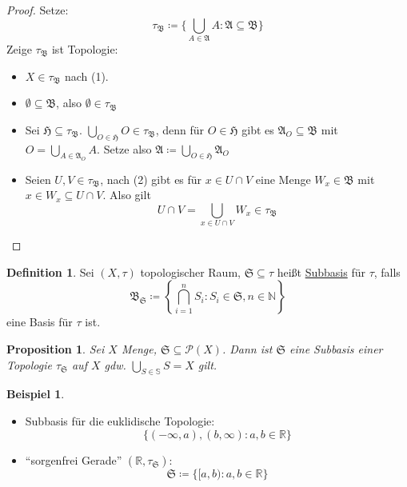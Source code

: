 \documentclass[12pt]{scrartcl}%
\newtheorem{prop}{Proposition}
\theoremstyle{definition}
\newtheorem*{defn}{Definition}
\newtheorem{ex}{Beispiel}
\theoremstyle{remark}
\newcommand{\powerset}{\mathcal{P}}
\begin{document}
\begin{proof}
    Setze: $$\tau_\mathfrak{B} \coloneqq \{ \bigcup_{A\in \mathfrak{A}} A: \mathfrak{A} \subseteq \mathfrak{B} \}$$ Zeige $\tau_\mathfrak{B}$ ist Topologie:

    \begin{itemize}
        \item $X\in \tau_\mathfrak{B}$ nach (1).
        \item $\emptyset \subseteq \mathfrak{B}$, also $\emptyset \in \tau_\mathfrak{B}$
        \item Sei $\mathfrak{H} \subseteq \tau_\mathfrak{B}$. $\bigcup_{O\in \mathfrak{H}} O \in \tau_\mathfrak{B}$, denn für $O\in\mathfrak{H}$ gibt es $\mathfrak{A}_O\subseteq \mathfrak{B}$ mit $O = \bigcup_{A\in \mathfrak{A}_O} A$. Setze also $\mathfrak{A} \coloneqq \bigcup_{O\in \mathfrak{H}} \mathfrak{A}_O$
        \item Seien $U,V\in \tau_\mathfrak{B}$, nach (2) gibt es für $x\in U\cap V$ eine Menge $W_x\in \mathfrak{B}$ mit $x\in W_x \subseteq U \cap V$. Also gilt $$U\cap V = \bigcup_{x\in U\cap V} W_x \in \tau_\mathfrak{B}$$
    \end{itemize}
\end{proof}

\begin{defn}
    Sei $(X,\tau)$ topologischer Raum, $\mathfrak{S} \subseteq \tau$ heißt \underline{Subbasis} für $\tau$, falls $$\mathfrak{B}_\mathfrak{S} \coloneqq \left\{ \bigcap_{i=1}^n S_i: S_i\in \mathfrak{S}, n\in \mathbb{N} \right\}$$ eine Basis für $\tau$ ist.
\end{defn}

\begin{prop}
    Sei $X$ Menge, $\mathfrak{S} \subseteq \powerset(X)$. Dann ist $\mathfrak{S}$ eine Subbasis einer Topologie $\tau_\mathfrak{S}$ auf $X$ gdw. $\bigcup_{S\in \mathbb{S}} S = X$ gilt.
\end{prop}

\begin{ex}
    \begin{itemize}
        \item Subbasis für die euklidische Topologie: $$\{ (-\infty, a), (b,\infty): a,b\in \mathbb{R} \}$$
        \item \enquote{sorgenfrei Gerade} $(\mathbb R, \tau_\mathfrak{S})$: $$\mathfrak{S} \coloneqq \{ [a,b): a,b\in \mathbb R \}$$
    \end{itemize}
\end{ex}
\end{document}
